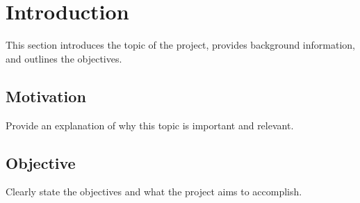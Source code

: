 \section{Introduction} %

This section introduces the topic of the project, provides background information, and outlines the objectives.

\subsection{Motivation}
Provide an explanation of why this topic is important and relevant.

\subsection{Objective}
Clearly state the objectives and what the project aims to accomplish.

